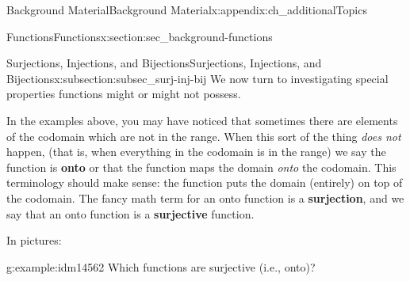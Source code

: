 \documentclass[oneside,10pt,]{book}
\newcommand{\terminology}[1]{\textbf{#1}}
\numberwithin{equation}{chapter}
\begin{document}
\begin{appendixptx}{Background Material}{}{Background Material}{}{}{x:appendix:ch_additionalTopics}
\begin{sectionptx}{Functions}{}{Functions}{}{}{x:section:sec_background-functions}
\typeout{************************************************}
%
\begin{subsectionptx}{Surjections, Injections, and Bijections}{}{Surjections, Injections, and Bijections}{}{}{x:subsection:subsec_surj-inj-bij}
We now turn to investigating special properties functions might or might not possess.%
\par
In the examples above, you may have noticed that sometimes there are elements of the codomain which are not in the range. When this sort of the thing \emph{does not} happen, (that is, when everything in the codomain is in the range) we say the function is \terminology{onto} or that the function maps the domain \emph{onto} the codomain. This terminology should make sense: the function puts the domain (entirely) on top of the codomain. The fancy math term for an onto function is a \terminology{surjection}, and we say that an onto function is a \terminology{surjective} function.%
\par
In pictures:%
\begin{sidebyside}{2}{0.1}{0.1}{0.2}%
\begin{sbspanel}{0.3}%
%
\end{sbspanel}%
\begin{sbspanel}{0.3}%
%
\end{sbspanel}%
\end{sidebyside}%
\begin{example}{}{g:example:idm14562}%
Which functions are surjective (i.e., onto)?%

\end{example}
\end{subsectionptx}
\end{sectionptx}
\end{appendixptx}
\end{document}

